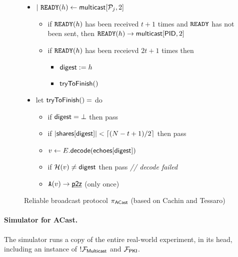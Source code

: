 \begin{figure}[h!]
\begin{boxedminipage}{\columnwidth}
\begin{itemize}[leftmargin=2mm]
\begin{itemize}[leftmargin=2mm]
      \end{itemize}
    \item[] $|~ \mathtt {READY}(h) \leftarrow {\mathsf {multicast}}[\mathcal P_j, 2]$
      \begin{itemize}[leftmargin=2mm]
      \item[] if $\mathtt {READY}(h)$ has been received $t+1$ times and $\mathtt {READY}$ has not been sent, then $\mathtt {READY}(h) \rightarrow {\mathsf {multicast}}[{\mathsf {PID}},2]$
      \item[] if $\mathtt {READY}(h)$ has been receievd $2t+1$ times then 
        \begin{itemize}[leftmargin=2mm]
        \item[] ${\mathsf {digest}} := h$
        \item[] ${\mathsf {tryToFinish}}()$
        \end{itemize}
      \end{itemize}
    \item[] let ${\mathsf {tryToFinish}}() = $ do
      \begin{itemize}[leftmargin=2mm]
      \item[] if ${\mathsf {digest}} = \bot$ then pass
      \item[] if $|{\mathsf {shares}}[{\mathsf {digest}}]| < \lceil(N-t+1)/2\rceil$ then pass
      \item[] $v \leftarrow E.{\mathsf {decode}}({\mathsf {echoes}}[{\mathsf {digest}}])$
      \item[] if ${\mathcal H}(v) \neq {\mathsf {digest}}$ then pass \emph{// decode failed}
      \item[] $\mathtt {A}(v) \rightarrow {\underline{\smash{\ensuremath{{\mathsf {p2z}}}}}}$ (only once)
      \end{itemize}
    \end{itemize}
  \end{boxedminipage}
  \caption{
    \label{fig:prot_acast}
    Reliable broadcast protocol ${\pi}_{\textnormal{\ensuremath{{\mathsf {{ACast}}}}}}$ (based on Cachin and Tessaro\cite{dispersal})
  }
\end{figure}



\paragraph{Simulator for ACast.}

The simulator runs a copy of the entire real-world experiment, in its head, including an instance of $!\F{Multicast}$ and $\F{PKI}$. 

